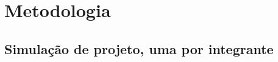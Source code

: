 \documentclass[11pt,a4paper]{article}
\begin{document}





\section{Metodologia}



\subsection{Simulação de projeto, uma por integrante}

\end{document}
